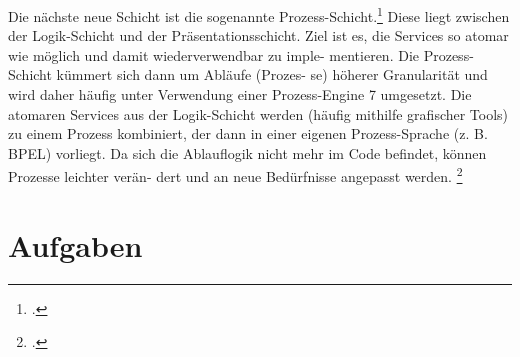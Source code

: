 \documentclass{lehramt-informatik}
\begin{document}
Die nächste neue Schicht ist die sogenannte
Prozess-Schicht.\footcite[Seite 17]{sosy:fs:4} Diese liegt zwischen der
Logik-Schicht und der Präsentationsschicht. Ziel ist es, die Services so
atomar wie möglich und damit wiederverwendbar zu imple- mentieren. Die
Prozess-Schicht kümmert sich dann um Abläufe (Prozes- se) höherer
Granularität und wird daher häufig unter Verwendung einer Prozess-Engine
7 umgesetzt. Die atomaren Services aus der Logik-Schicht werden (häufig
mithilfe grafischer Tools) zu einem Prozess kombiniert, der dann in
einer eigenen Prozess-Sprache (z. B. BPEL) vorliegt. Da sich die
Ablauflogik nicht mehr im Code befindet, können Prozesse leichter verän-
dert und an neue Bedürfnisse angepasst werden.
\footcite[Seite 214-215]{schatten}


\chapter{Aufgaben}

\literatur
\end{document}
